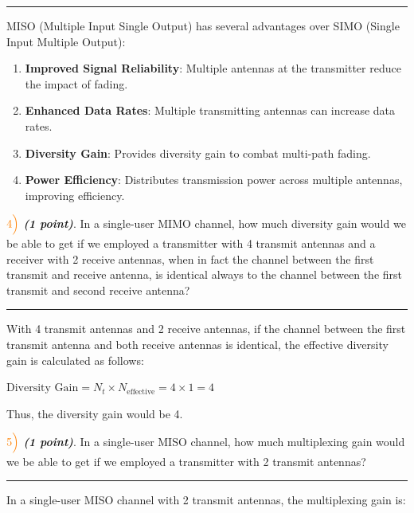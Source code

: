 \documentclass[11pt]{article}
\providecommand{\tightlist}{%
      \setlength{\itemsep}{0pt}\setlength{\parskip}{0pt}}
\begin{document}
    \begin{center}\rule{0.5\linewidth}{0.5pt}\end{center}

MISO (Multiple Input Single Output) has several advantages over SIMO
(Single Input Multiple Output):

\begin{enumerate}
\def\labelenumi{\arabic{enumi}.}
\tightlist
\item
  \textbf{Improved Signal Reliability}: Multiple antennas at the
  transmitter reduce the impact of fading.
\item
  \textbf{Enhanced Data Rates}: Multiple transmitting antennas can
  increase data rates.
\item
  \textbf{Diversity Gain}: Provides diversity gain to combat multi-path
  fading.
\item
  \textbf{Power Efficiency}: Distributes transmission power across
  multiple antennas, improving efficiency.
\end{enumerate}

    \(\color{orange}4\Bigl)\) \textbf{\emph{(1 point)}}. In a single-user
MIMO channel, how much diversity gain would we be able to get if we
employed a transmitter with 4 transmit antennas and a receiver with 2
receive antennas, when in fact the channel between the first transmit
and receive antenna, is identical always to the channel between the
first transmit and second receive antenna?

    \begin{center}\rule{0.5\linewidth}{0.5pt}\end{center}

With 4 transmit antennas and 2 receive antennas, if the channel between
the first transmit antenna and both receive antennas is identical, the
effective diversity gain is calculated as follows:

\(\text{Diversity Gain} = N_t \times N_{\text{effective}} = 4 \times 1 = 4\)

Thus, the diversity gain would be 4.

    \(\color{orange}5\Bigl)\) \textbf{\emph{(1 point)}}. In a single-user
MISO channel, how much multiplexing gain would we be able to get if we
employed a transmitter with 2 transmit antennas?

    \begin{center}\rule{0.5\linewidth}{0.5pt}\end{center}

In a single-user MISO channel with 2 transmit antennas, the multiplexing
gain is:
\end{document}
